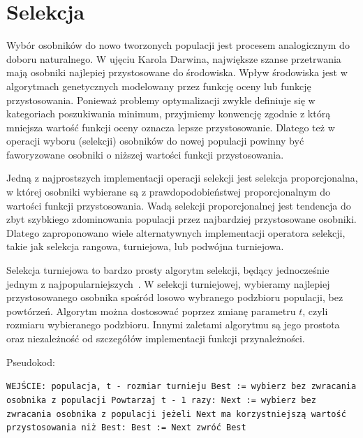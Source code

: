 \documentclass[brudnopis]{xmgr}
\begin{document}
\section{Selekcja}

Wybór osobników do nowo tworzonych populacji jest procesem analogicznym do doboru naturalnego. W ujęciu Karola Darwina, największe szanse przetrwania mają osobniki najlepiej przystosowane do środowiska. Wpływ środowiska jest w algorytmach genetycznych modelowany przez funkcję oceny lub funkcję przystosowania. Ponieważ problemy optymalizacji zwykle definiuje się w kategoriach poszukiwania minimum, przyjmiemy konwencję zgodnie z którą mniejsza wartość funkcji oceny oznacza lepsze przystosowanie. Dlatego też w operacji wyboru (selekcji) osobników do nowej populacji powinny być faworyzowane osobniki o niższej wartości funkcji przystosowania.

Jedną z najprostszych implementacji operacji selekcji jest selekcja proporcjonalna, w której osobniki wybierane są z prawdopodobieństwej proporcjonalnym do wartości funkcji przystosowania. Wadą selekcji proporcjonalnej jest tendencja do zbyt szybkiego zdominowania populacji przez najbardziej przystosowane osobniki. Dlatego zaproponowano wiele alternatywnych implementacji operatora selekcji, takie jak selekcja rangowa, turniejowa, lub podwójna turniejowa.

Selekcja turniejowa to bardzo prosty algorytm selekcji, będący jednocześnie jednym z najpopularniejszych~\cite{Luke2009Metaheuristics}. W selekcji turniejowej, wybieramy najlepiej przystosowanego osobnika spośród losowo wybranego podzbioru populacji, bez powtórzeń. Algorytm można dostosować poprzez zmianę parametru $t$, czyli rozmiaru wybieranego podzbioru. Innymi zaletami algorytmu są jego prostota oraz niezależność od szczegółów implementacji funkcji przynależności.

Pseudokod:\newline

\noindent
\texttt{WEJŚCIE: populacja, t - rozmiar turnieju\newline
Best := wybierz bez zwracania osobnika z populacji\newline
Powtarzaj t - 1 razy:\newline
\indent Next := wybierz bez zwracania osobnika z populacji\newline
\indent jeżeli Next ma korzystniejszą wartość przystosowania niż Best:\newline
\indent\indent Best := Next\newline
zwróć Best\newline
}
\end{document}
